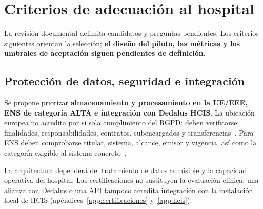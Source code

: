 \clearpage
\section{Criterios de adecuación al hospital}
\label{sec:evaluacion}
La revisión documental delimita candidatos y preguntas pendientes. Los criterios siguientes orientan la selección; \textbf{el diseño del piloto, las métricas y los umbrales de aceptación siguen pendientes de definición}.

\subsection{Protección de datos, seguridad e integración}
Se propone priorizar \textbf{almacenamiento y procesamiento en la UE/EEE, ENS de categoría ALTA e integración con Dedalus HCIS}. La ubicación europea no acredita por sí sola cumplimiento del RGPD: deben verificarse finalidades, responsabilidades, contratos, subencargados y transferencias~\cite{rgpd2016}. Para ENS deben comprobarse titular, sistema, alcance, emisor y vigencia, así como la categoría exigible al sistema concreto~\cite{ens2022}.

La arquitectura dependerá del tratamiento de datos admisible y la capacidad operativa del hospital. Las certificaciones no sustituyen la evaluación clínica; una alianza con Dedalus o una API tampoco acredita integración con la instalación local de HCIS (apéndices~\ref{app:certificaciones} y~\ref{app:hcis}).

